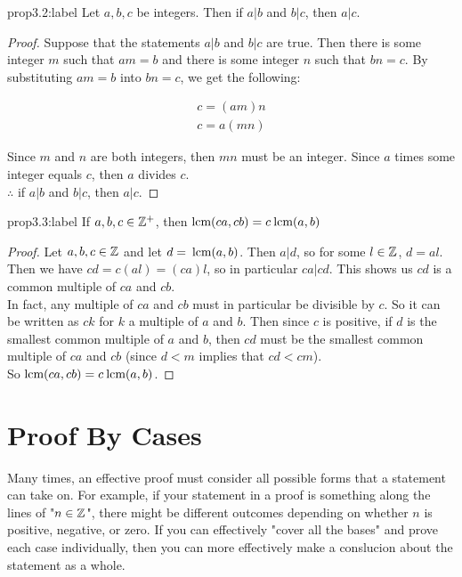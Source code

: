 \begin{proposition}{prop3.2:label}
    Let $a,b,c$ be integers. Then if $a|b$ and $b|c$, then $a|c$. 
\end{proposition}

\begin{proof}
    Suppose that the statements $a|b$ and $b|c$ are true. Then there is some integer $m$ such that $am = b$ and there is some integer $n$ such that $bn = c$. By substituting $am = b$ into $bn = c$, we get the following:

    $$
    \begin{aligned}
        c = (am)n\\
        c = a(mn)
    \end{aligned}
    $$

    Since $m$ and $n$ are both integers, then $mn$ must be an integer. Since $a$ times some integer equals $c$, then $a$ divides $c$.\\

    $\therefore$ if $a|b$ and $b|c$, then $a|c$.
\end{proof}

\begin{proposition}{prop3.3:label}
    If $a,b,c \in \mathbb{Z}^+$, then $\text{lcm}(ca,cb) = c\:\text{lcm}(a,b)$
\end{proposition}

\begin{proof}
    Let $a,b,c\in\mathbb{Z}$ and let $d=\:\text{lcm}(a,b)$. Then $a|d$, so for some $l\in\mathbb{Z}$, $d=al$. Then we have $cd = c(al) = (ca)l$, so in particular $ca|cd$. This shows us $cd$ is a common multiple of $ca$ and $cb$. \\

    In fact, any multiple of $ca$ and $cb$ must in particular be divisible by $c$. So it can be written as $ck$ for $k$ a multiple of $a$ and $b$. Then since $c$ is positive, if $d$ is the smallest common multiple of $a$ and $b$, then $cd$ must be the smallest common multiple of $ca$ and $cb$ (since $d<m$ implies that $cd < cm$). \\

    So $\text{lcm}(ca,cb) = c\:\text{lcm}(a,b)$.
\end{proof}

\section{Proof By Cases}

Many times, an effective proof must consider all possible forms that a statement can take on. For example, if your statement in a proof is something along the lines of "$n \in \mathbb{Z}$", there might be different outcomes depending on whether $n$ is positive, negative, or zero. If you can effectively "cover all the bases" and prove each case individually, then you can more effectively make a conslucion about the statement as a whole.\\

